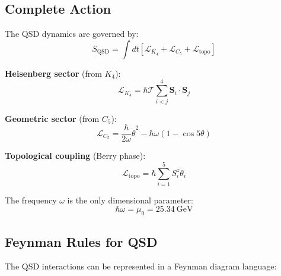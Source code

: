 \documentclass[11pt,a4paper]{article}
\theoremstyle{definition}
\newcommand{\Tc}{\mathcal{T}}           %
\newcommand{\murad}{\mu_0}              %
\newcommand{\LL}{\mathcal{L}}           %
\begin{document}
\subsection{Complete Action}

The QSD dynamics are governed by:
\begin{equation}
S_{\text{QSD}} = \int dt \left[ \LL_{K_4} + \LL_{C_5} + \LL_{\text{topo}} \right]
\label{eq:action}
\end{equation}

\textbf{Heisenberg sector} (from $K_4$):
\begin{equation}
\LL_{K_4} = \hbar\Tc \sum_{i<j}^{4} \mathbf{S}_i \cdot \mathbf{S}_j
\end{equation}

\textbf{Geometric sector} (from $C_5$):
\begin{equation}
\LL_{C_5} = \frac{\hbar}{2\omega}\dot{\theta}^2 - \hbar\omega(1 - \cos 5\theta)
\end{equation}

\textbf{Topological coupling} (Berry phase):
\begin{equation}
\LL_{\text{topo}} = \hbar \sum_{i=1}^{5} S_i^z \dot{\theta}_i
\end{equation}

The frequency $\omega$ is the only dimensional parameter:
\begin{equation}
\hbar\omega = \murad = 25.34~\text{GeV}
\end{equation}

\subsection{Feynman Rules for QSD}

The QSD interactions can be represented in a Feynman diagram language:
\end{document}
